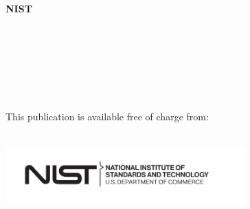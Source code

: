 	\begin{titlepage}
		\begin{flushright}
\LARGE{{\textbf{NIST \pubseries}}}\\
\LARGE{{\textbf{\pubnumber}}}\\
\vfill
\Huge{{\textbf{\pubtitle}}}\\
\Large{{\textit{\pubsubtitle}}}\\
\vfill
\large \authorone\\
\large \authortwo\\
\large \authorthree\\
\large \authorfour\\
\vfill
\normalsize This publication is available free of charge from:\\
\DOI\\
\vfill

\includegraphics[trim=0 0 0.7in 0,clip,width=3.62in]{../FIGURES/NIST-logo.pdf}\\

\end{flushright}
\end{titlepage}

